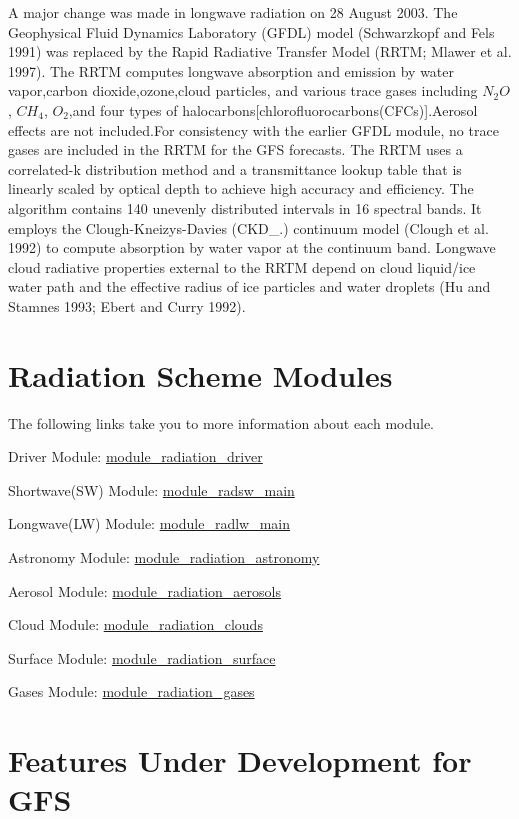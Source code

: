 A major change was made in longwave radiation on 28 August 2003. The Geophysical Fluid Dynamics Laboratory (G\+F\+DL) model (Schwarzkopf and Fels 1991) was replaced by the Rapid Radiative Transfer Model (R\+R\+TM; Mlawer et al. 1997). The R\+R\+TM computes longwave absorption and emission by water vapor,carbon dioxide,ozone,cloud particles, and various trace gases including $N_2O$, $CH_4$, $O_2$,and four types of halocarbons\mbox{[}chlorofluorocarbons(\+C\+F\+Cs)\mbox{]}.Aerosol effects are not included.\+For consistency with the earlier G\+F\+DL module, no trace gases are included in the R\+R\+TM for the G\+FS forecasts. The R\+R\+TM uses a correlated-\/k distribution method and a transmittance lookup table that is linearly scaled by optical depth to achieve high accuracy and efficiency. The algorithm contains 140 unevenly distributed intervals in 16 spectral bands. It employs the Clough-\/\+Kneizys-\/\+Davies (C\+K\+D\+\_.) continuum model (Clough et al. 1992) to compute absorption by water vapor at the continuum band. Longwave cloud radiative properties external to the R\+R\+TM depend on cloud liquid/ice water path and the effective radius of ice particles and water droplets (Hu and Stamnes 1993; Ebert and Curry 1992).\hypertarget{index_mainpage-components}{}\section{Radiation Scheme Modules}\label{index_mainpage-components}
The following links take you to more information about each module.
\begin{DoxyItemize}
\item Driver Module\+: \hyperlink{namespacemodule__radiation__driver}{module\+\_\+radiation\+\_\+driver}
\item Shortwave(\+S\+W) Module\+: \hyperlink{namespacemodule__radsw__main}{module\+\_\+radsw\+\_\+main}
\item Longwave(\+L\+W) Module\+: \hyperlink{namespacemodule__radlw__main}{module\+\_\+radlw\+\_\+main}
\item Astronomy Module\+: \hyperlink{namespacemodule__radiation__astronomy}{module\+\_\+radiation\+\_\+astronomy}
\item Aerosol Module\+: \hyperlink{namespacemodule__radiation__aerosols}{module\+\_\+radiation\+\_\+aerosols}
\item Cloud Module\+: \hyperlink{namespacemodule__radiation__clouds}{module\+\_\+radiation\+\_\+clouds}
\item Surface Module\+: \hyperlink{namespacemodule__radiation__surface}{module\+\_\+radiation\+\_\+surface}
\item Gases Module\+: \hyperlink{namespacemodule__radiation__gases}{module\+\_\+radiation\+\_\+gases}
\end{DoxyItemize}\hypertarget{index_component}{}\section{Features Under Development for G\+FS}\label{index_component}


